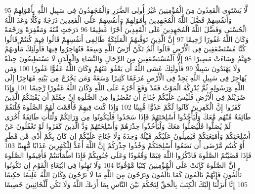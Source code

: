 \documentclass[20pt,a4paper]{article}
\begin{document}
{\tiny\colorbox{cl_aya}{95}} لَّا يَسْتَوِى الْقَعِدُونَ مِنَ الْمُؤْمِنِينَ غَيْرُ أُولِى الضَّرَرِ وَالْمُجَهِدُونَ فِى سَبِيلِ اللَّهِ بِأَمْوَلِهِمْ وَأَنفُسِهِمْ فَضَّلَ اللَّهُ الْمُجَهِدِينَ بِأَمْوَلِهِمْ وَأَنفُسِهِمْ عَلَى الْقَعِدِينَ دَرَجَةً وَكُلًّا وَعَدَ اللَّهُ الْحُسْنَى وَفَضَّلَ اللَّهُ الْمُجَهِدِينَ عَلَى الْقَعِدِينَ أَجْرًا عَظِيمًا
{\tiny\colorbox{cl_aya}{96}} دَرَجَتٍ مِّنْهُ وَمَغْفِرَةً وَرَحْمَةً وَكَانَ اللَّهُ غَفُورًا رَّحِيمًا
{\tiny\colorbox{cl_aya}{97}} إِنَّ الَّذِينَ تَوَفَّىهُمُ الْمَلَئِكَةُ ظَالِمِى أَنفُسِهِمْ قَالُوا فِيمَ كُنتُمْ قَالُوا كُنَّا مُسْتَضْعَفِينَ فِى الْأَرْضِ قَالُوا أَلَمْ تَكُنْ أَرْضُ اللَّهِ وَسِعَةً فَتُهَاجِرُوا فِيهَا فَأُولَئِكَ مَأْوَىهُمْ جَهَنَّمُ وَسَاءَتْ مَصِيرًا
{\tiny\colorbox{cl_aya}{98}} إِلَّا الْمُسْتَضْعَفِينَ مِنَ الرِّجَالِ وَالنِّسَاءِ وَالْوِلْدَنِ لَا يَسْتَطِيعُونَ حِيلَةً وَلَا يَهْتَدُونَ سَبِيلًا
{\tiny\colorbox{cl_aya}{99}} فَأُولَئِكَ عَسَى اللَّهُ أَن يَعْفُوَ عَنْهُمْ وَكَانَ اللَّهُ عَفُوًّا غَفُورًا
{\tiny\colorbox{cl_aya}{100}} وَمَن يُهَاجِرْ فِى سَبِيلِ اللَّهِ يَجِدْ فِى الْأَرْضِ مُرَغَمًا كَثِيرًا وَسَعَةً وَمَن يَخْرُجْ مِن بَيْتِهِ مُهَاجِرًا إِلَى اللَّهِ وَرَسُولِهِ ثُمَّ يُدْرِكْهُ الْمَوْتُ فَقَدْ وَقَعَ أَجْرُهُ عَلَى اللَّهِ وَكَانَ اللَّهُ غَفُورًا رَّحِيمًا
{\tiny\colorbox{cl_aya}{101}} وَإِذَا ضَرَبْتُمْ فِى الْأَرْضِ فَلَيْسَ عَلَيْكُمْ جُنَاحٌ أَن تَقْصُرُوا مِنَ الصَّلَوةِ إِنْ خِفْتُمْ أَن يَفْتِنَكُمُ الَّذِينَ كَفَرُوا إِنَّ الْكَفِرِينَ كَانُوا لَكُمْ عَدُوًّا مُّبِينًا
{\tiny\colorbox{cl_aya}{102}} وَإِذَا كُنتَ فِيهِمْ فَأَقَمْتَ لَهُمُ الصَّلَوةَ فَلْتَقُمْ طَائِفَةٌ مِّنْهُم مَّعَكَ وَلْيَأْخُذُوا أَسْلِحَتَهُمْ فَإِذَا سَجَدُوا فَلْيَكُونُوا مِن وَرَائِكُمْ وَلْتَأْتِ طَائِفَةٌ أُخْرَى لَمْ يُصَلُّوا فَلْيُصَلُّوا مَعَكَ وَلْيَأْخُذُوا حِذْرَهُمْ وَأَسْلِحَتَهُمْ وَدَّ الَّذِينَ كَفَرُوا لَوْ تَغْفُلُونَ عَنْ أَسْلِحَتِكُمْ وَأَمْتِعَتِكُمْ فَيَمِيلُونَ عَلَيْكُم مَّيْلَةً وَحِدَةً وَلَا جُنَاحَ عَلَيْكُمْ إِن كَانَ بِكُمْ أَذًى مِّن مَّطَرٍ أَوْ كُنتُم مَّرْضَى أَن تَضَعُوا أَسْلِحَتَكُمْ وَخُذُوا حِذْرَكُمْ إِنَّ اللَّهَ أَعَدَّ لِلْكَفِرِينَ عَذَابًا مُّهِينًا
{\tiny\colorbox{cl_aya}{103}} فَإِذَا قَضَيْتُمُ الصَّلَوةَ فَاذْكُرُوا اللَّهَ قِيَمًا وَقُعُودًا وَعَلَى جُنُوبِكُمْ فَإِذَا اطْمَأْنَنتُمْ فَأَقِيمُوا الصَّلَوةَ إِنَّ الصَّلَوةَ كَانَتْ عَلَى الْمُؤْمِنِينَ كِتَبًا مَّوْقُوتًا
{\tiny\colorbox{cl_aya}{104}} وَلَا تَهِنُوا فِى ابْتِغَاءِ الْقَوْمِ إِن تَكُونُوا تَأْلَمُونَ فَإِنَّهُمْ يَأْلَمُونَ كَمَا تَأْلَمُونَ وَتَرْجُونَ مِنَ اللَّهِ مَا لَا يَرْجُونَ وَكَانَ اللَّهُ عَلِيمًا حَكِيمًا
{\tiny\colorbox{cl_aya}{105}} إِنَّا أَنزَلْنَا إِلَيْكَ الْكِتَبَ بِالْحَقِّ لِتَحْكُمَ بَيْنَ النَّاسِ بِمَا أَرَىكَ اللَّهُ وَلَا تَكُن لِّلْخَائِنِينَ خَصِيمًا
\end{document}
